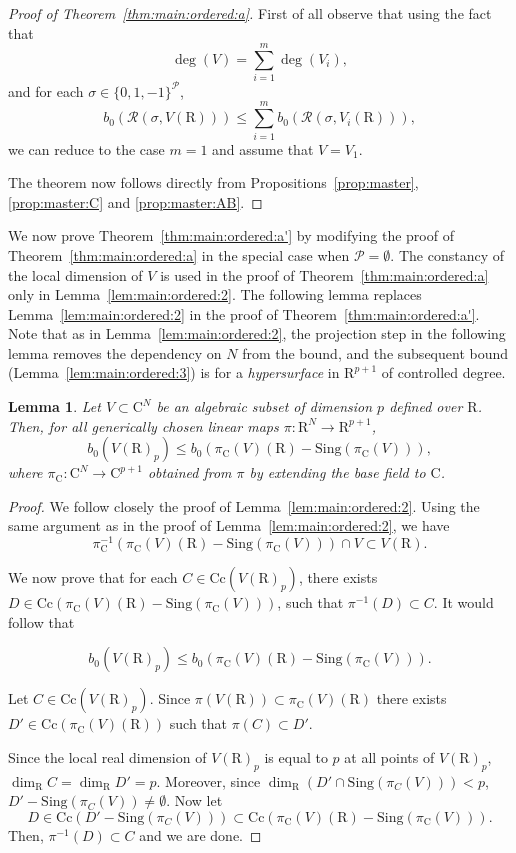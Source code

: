 \documentclass[10pt]{amsart}
\newtheorem{lemma}{Lemma}[section]
\theoremstyle{definition}
\theoremstyle{remark}
\numberwithin{equation}{section}
\newcommand {\R} {\mathrm{R}}
\newcommand {\C}     {\mathrm{C}}
\newcommand {\RR} {{\mathcal R}}
\newcommand{\Cc}{\mathrm{Cc}}
\newcommand{\Sing}{\mathrm{Sing}}
\begin{document}
\begin{proof}[Proof of Theorem~\ref{thm:main:ordered:a}]
    First of all observe that using the fact that 
    \[
    \deg(V) = \sum_{i=1}^m \deg(V_i),
    \]
    and for each $\sigma \in \{0,1,-1\}^{\mathcal{P}}$,
    \[
    b_0(\RR(\sigma,V(\R))) \leq \sum_{i=1}^m b_0(\RR(\sigma,V_i(\R))),
    \]
    we can reduce to the case $m=1$ and assume that $V = V_1$.
    
   The theorem now follows directly from Propositions~\ref{prop:master}, \ref{prop:master:C} and \ref{prop:master:AB}. 
\end{proof}

We now prove Theorem~\ref{thm:main:ordered:a'} by modifying the proof of Theorem~\ref{thm:main:ordered:a} in the special case when
$\mathcal{P} = \emptyset$. The constancy of the local dimension of  $V$ is used in the proof of Theorem~\ref{thm:main:ordered:a} only in Lemma~\ref{lem:main:ordered:2}. The following lemma replaces
Lemma~\ref{lem:main:ordered:2} in the proof of Theorem~\ref{thm:main:ordered:a'}.
Note that as in Lemma~\ref{lem:main:ordered:2}, the projection step in the following lemma removes the dependency on $N$ from the bound, and the subsequent bound (Lemma~\ref{lem:main:ordered:3}) is for a \emph{hypersurface} in $\R^{p+1}$ of controlled degree.

\begin{lemma}
\label{lem:main:ordered:2'}
   Let $V \subset \C^N$ be an algebraic subset of dimension $p$ defined over $\R$. Then, for all generically chosen linear maps
   $\pi:\R^N \rightarrow \R^{p+1}$, 
   \[
        b_0(V(\R)_p) \leq  b_0(\pi_\C(V)(\R) - \Sing(\pi_\C(V))),
   \]
   where $\pi_\C: \C^N \rightarrow \C^{p+1}$ obtained from $\pi$ by 
   extending the base field to $\C$.
\end{lemma}

\begin{proof}
We follow closely the proof of Lemma~\ref{lem:main:ordered:2}.
Using the same argument as in the proof of Lemma~\ref{lem:main:ordered:2},
we have 
    \[
    \pi_\C^{-1}(\pi_\C(V)(\R) - \Sing(\pi_\C(V))) \cap V \subset V(\R). 
    \]

    We now prove that for each $C \in \Cc(V(\R)_p)$, there exists 
    $D \in \Cc(\pi_\C(V)(\R) - \Sing(\pi_\C(V)))$, such that 
    $\pi^{-1}(D) \subset C$. It would follow that

    \[
    b_0(V(\R)_p) \leq b_0(\pi_\C(V)(\R) - \Sing(\pi_\C(V))).
    \]

    Let $C \in \Cc(V(\R)_p)$. Since $\pi(V(\R)) \subset \pi_\C(V)(\R)$ there exists 
     $D' \in \Cc(\pi_\C(V)(\R))$
    such that $\pi(C) \subset D'$. 

    Since the local real dimension of $V(\R)_p$ is equal to $p$ at all points of $V(\R)_p$,
    $\dim_\R C = \dim_\R D' = p$.
    Moreover, since $\dim_\R (D' \cap \Sing(\pi_C(V))) < p$, 
    $D' - \Sing(\pi_C(V)) \neq \emptyset$.
    Now let 
    \[
    D \in \Cc(D' - \Sing(\pi_C(V))) \subset \Cc(\pi_\C(V)(\R) - \Sing(\pi_\C(V))).
    \]
    Then, $\pi^{-1}(D) \subset C$ and we are done.
\end{proof}
\end{document}
